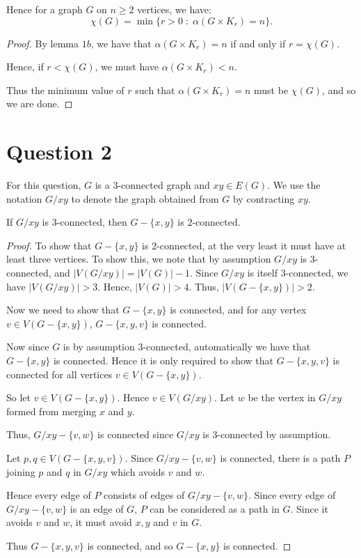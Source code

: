 \documentclass{unswmaths}
\begin{document}
\begin{corollary}[Part (c)]
    Hence for a graph $G$ on $n\geq 2$ vertices, we have:
    \begin{equation*}
        \chi(G) = \min\{r > 0\;:\;\alpha(G\times K_r) = n\}.
    \end{equation*}
\end{corollary}
\begin{proof}
    By lemma $1b$, we have that $\alpha(G\times K_r) = n$ if and only
    if $r = \chi(G)$. 
    
    Hence, if $r < \chi(G)$, we must have $\alpha(G\times K_r) < n$. 
    
    Thus the minimum value of $r$ such that $\alpha(G\times K_r) = n$
    must be $\chi(G)$, and so we are done.
\end{proof} 

\section*{Question 2}
For this question, $G$ is a $3$-connected graph and $xy \in E(G)$. 
We use the notation $G/xy$ to denote the graph obtained from $G$
by contracting $xy$.

\begin{proposition}[Part (a)]
    If $G/xy$ is $3$-connected, then $G - \{x,y\}$ is $2$-connected.
\end{proposition}
\begin{proof}
    To show that $G-\{x,y\}$ is $2$-connected, at the very least it must have at
    least three vertices. To show this, we note that by assumption $G/xy$ is $3$-connected,
    and $|V(G/xy)| = |V(G)|-1$. Since $G/xy$ is itself $3$-connected, we have $|V(G/xy)| > 3$.
    Hence, $|V(G)| > 4$. Thus, $|V(G-\{x,y\})| > 2$. 
    
    Now we need to show that $G-\{x,y\}$ is connected, and for any vertex $v \in V(G-\{x,y\})$,
    $G-\{x,y,v\}$ is connected. 
    
    Now since $G$ is by assumption $3$-connected, automatically we have that $G-\{x,y\}$ is connected.
    Hence it is only required to show that $G-\{x,y,v\}$ is connected for all
    vertices $v \in V(G-\{x,y\})$. 
    
    So let $v \in V(G-\{x,y\})$. Hence $v \in V(G/xy)$.
    Let $w$ be the vertex in $G/xy$ formed from merging $x$ and $y$.
    
    Thus, $G/xy-\{v,w\}$ is connected since $G/xy$ is $3$-connected by assumption.
    
    Let $p,q \in V(G-\{x,y,v\})$. Since $G/xy-\{v,w\}$ is connected,
    there is a path $P$ joining $p$ and $q$ in $G/xy$ which avoids $v$ and $w$. 
    
    Hence every edge of $P$ consists of edges of $G/xy-\{v,w\}$. 
    Since every edge of $G/xy-\{v,w\}$ is an edge of $G$, $P$
    can be considered as a path in $G$. Since it avoids $v$ and $w$, it 
    must avoid $x,y$ and $v$ in $G$.     
    
    Thus $G-\{x,y,v\}$ is
    connected, and so $G-\{x,y\}$ is connected. 
\end{proof}
\end{document}
